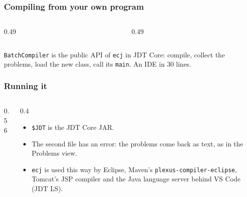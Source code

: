 \documentclass[aspectratio=169,10pt,compress]{beamer}
\begin{document}
\begin{frame}[t,fragile] \frametitle{Compiling from your own program}
  \begin{columns}[T]
    \begin{column}{0.49\textwidth}
    \end{column}
    \begin{column}{0.49\textwidth}
    \end{column}
  \end{columns}

  \small \texttt{BatchCompiler} is the public API of \texttt{ecj} in JDT Core: compile, collect the problems,
  load the new class, call its \texttt{main}. An IDE in 30 lines.
\end{frame}




\begin{frame}[t,fragile] \frametitle{Running it}
  \begin{columns}[T]
    \begin{column}{0.56\textwidth}
    \end{column}
    \begin{column}{0.4\textwidth}
      \begin{itemize}\small
        \item \texttt{\$JDT} is the JDT Core JAR.
        \item The second file has an error: the problems come back as text, as in the Problems view.
        \item \texttt{ecj} is used this way by Eclipse, Maven's \texttt{plexus-compiler-eclipse}, Tomcat's JSP compiler
              and the Java language server behind VS Code (JDT LS).
      \end{itemize}
    \end{column}
  \end{columns}
\end{frame}
\end{document}
